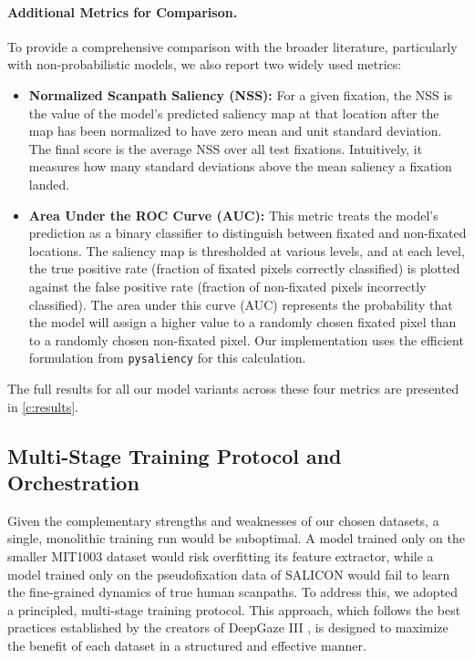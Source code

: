 \paragraph{Additional Metrics for Comparison.} To provide a comprehensive comparison with the broader literature, particularly with non-probabilistic models, we also report two widely used metrics:
\begin{itemize}
    \item \textbf{Normalized Scanpath Saliency (NSS):} For a given fixation, the NSS is the value of the model's predicted saliency map at that location after the map has been normalized to have zero mean and unit standard deviation. The final score is the average NSS over all test fixations. Intuitively, it measures how many standard deviations above the mean saliency a fixation landed.
    \item \textbf{Area Under the ROC Curve (AUC):} This metric treats the model's prediction as a binary classifier to distinguish between fixated and non-fixated locations. The saliency map is thresholded at various levels, and at each level, the true positive rate (fraction of fixated pixels correctly classified) is plotted against the false positive rate (fraction of non-fixated pixels incorrectly classified). The area under this curve (AUC) represents the probability that the model will assign a higher value to a randomly chosen fixated pixel than to a randomly chosen non-fixated pixel. Our implementation uses the efficient formulation from \texttt{pysaliency} for this calculation.
\end{itemize}
The full results for all our model variants across these four metrics are presented in \cref{c:results}.

\subsection{Multi-Stage Training Protocol and Orchestration}
\label{sec:method_training_protocol}
Given the complementary strengths and weaknesses of our chosen datasets, a single, monolithic training run would be suboptimal. A model trained only on the smaller MIT1003 dataset would risk overfitting its feature extractor, while a model trained only on the pseudofixation data of SALICON would fail to learn the fine-grained dynamics of true human scanpaths.
To address this, we adopted a principled, multi-stage training protocol. This approach, which follows the best practices established by the creators of DeepGaze III \cite{kummerer2022deepgaze}, is designed to maximize the benefit of each dataset in a structured and effective manner.
